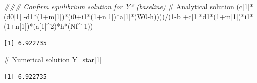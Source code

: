 \documentclass[
  letterpaper,
  DIV=11,
  numbers=noendperiod]{scrreprt}
\newenvironment{Shaded}{\begin{snugshade}}{\end{snugshade}}
\newcommand{\CommentTok}[1]{\textcolor[rgb]{0.37,0.37,0.37}{#1}}
\newcommand{\DecValTok}[1]{\textcolor[rgb]{0.68,0.00,0.00}{#1}}
\newcommand{\DocumentationTok}[1]{\textcolor[rgb]{0.37,0.37,0.37}{\textit{#1}}}
\newcommand{\NormalTok}[1]{\textcolor[rgb]{0.00,0.23,0.31}{#1}}
\newcommand{\SpecialCharTok}[1]{\textcolor[rgb]{0.37,0.37,0.37}{#1}}
\begin{document}
\begin{Shaded}
\begin{Highlighting}[]
\DocumentationTok{\#\#\# Confirm equilibrium solution for Y*  (baseline)}
\CommentTok{\# Analytical solution}
\NormalTok{(c[}\DecValTok{1}\NormalTok{]}\SpecialCharTok{*}\NormalTok{(d0[}\DecValTok{1}\NormalTok{] }\SpecialCharTok{{-}}\NormalTok{d1}\SpecialCharTok{*}\NormalTok{(}\DecValTok{1}\SpecialCharTok{+}\NormalTok{m[}\DecValTok{1}\NormalTok{])}\SpecialCharTok{*}\NormalTok{(i0}\SpecialCharTok{+}\NormalTok{i1}\SpecialCharTok{*}\NormalTok{(}\DecValTok{1}\SpecialCharTok{+}\NormalTok{n[}\DecValTok{1}\NormalTok{])}\SpecialCharTok{*}\NormalTok{a[}\DecValTok{1}\NormalTok{]}\SpecialCharTok{*}\NormalTok{(W0}\SpecialCharTok{{-}}\NormalTok{h))))}\SpecialCharTok{/}\NormalTok{(}\DecValTok{1}\SpecialCharTok{{-}}\NormalTok{b }\SpecialCharTok{+}\NormalTok{c[}\DecValTok{1}\NormalTok{]}\SpecialCharTok{*}\NormalTok{d1}\SpecialCharTok{*}\NormalTok{(}\DecValTok{1}\SpecialCharTok{+}\NormalTok{m[}\DecValTok{1}\NormalTok{])}\SpecialCharTok{*}\NormalTok{i1}\SpecialCharTok{*}\NormalTok{(}\DecValTok{1}\SpecialCharTok{+}\NormalTok{n[}\DecValTok{1}\NormalTok{])}\SpecialCharTok{*}\NormalTok{(a[}\DecValTok{1}\NormalTok{]}\SpecialCharTok{\^{}}\DecValTok{2}\NormalTok{)}\SpecialCharTok{*}\NormalTok{h}\SpecialCharTok{*}\NormalTok{(Nf}\SpecialCharTok{\^{}{-}}\DecValTok{1}\NormalTok{))}
\end{Highlighting}
\end{Shaded}

\begin{verbatim}
[1] 6.922735
\end{verbatim}

\begin{Shaded}
\begin{Highlighting}[]
\CommentTok{\# Numerical solution}
\NormalTok{Y\_star[}\DecValTok{1}\NormalTok{]}
\end{Highlighting}
\end{Shaded}

\begin{verbatim}
[1] 6.922735
\end{verbatim}
\end{document}

